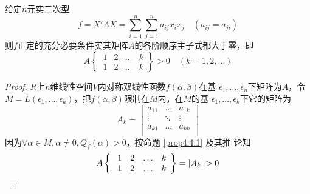 \documentclass[11pt]{article}
\begin{document}
\begin{theorem}[]
给定\(n\)元实二次型
\begin{equation*}
f=X'AX=\sum_{i=1}^n\sum_{j=1}^na_{ij}x_ix_j\quad(a_{ij}=a_{ji})
\end{equation*}
则\(f\)正定的充分必要条件实其矩阵\(A\)的各阶顺序主子式都大于零，即
\begin{equation*}
A\left\{\
\begin{array}{cccc}
1&2&\dots&k\\
1&2&\dots&k
\end{array}
\right\}>0\quad(k=1,2,\dots)
\end{equation*}
\end{theorem}

\begin{proof}
\(R\)上\(n\)维线性空间\(V\)内对称双线性函数\(f(\alpha,\beta)\)在基
\(\epsilon_1,\dots,\epsilon_n\)下矩阵为\(A\)，令
\(M=L(\epsilon_1,\dots,\epsilon_k)\)，把\(f(\alpha,\beta)\)限制在\(M\)内，在\(M\)的基
\(\epsilon_1,\dots,\epsilon_k\)下它的矩阵为
\begin{equation*}
A_k=
\begin{bmatrix}
a_{11}&\dots&a_{1k}\\
\vdots&\ddots&\vdots\\
a_{k1}&\dots&a_{kk}\\
\end{bmatrix}
\end{equation*}
因为\(\forall\alpha\in M,\alpha\neq0,Q_f(\alpha)>0\)，按命题 \ref{prop4.4.1} 及其推
论知
\begin{equation*}
A\left\{\
\begin{array}{cccc}
1&2&\dots&k\\
1&2&\dots&k
\end{array}
\right\}=\abs{A_k}>0
\end{equation*}


\end{proof}
\end{document}
